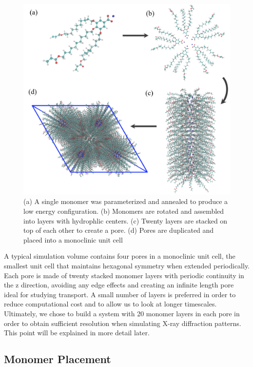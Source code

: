\documentclass{article}
\begin{document}
  \begin{figure}
	\centering
	\includegraphics[width=0.75\linewidth]{build.PNG} %
	\caption{(a) A single monomer was parameterized and annealed to produce a low energy
		configuration. (b) Monomers are rotated and assembled into layers with 
		hydrophlic centers. (c) Twenty layers are stacked on top of each other to create
		a pore. (d) Pores are duplicated and placed into a monoclinic unit cell}\label{fig:python}
  \end{figure}
  
  A typical simulation volume contains four pores in a monoclinic unit cell,
  the smallest unit cell that maintains hexagonal symmetry when extended
  periodically. Each pore is made of twenty stacked monomer layers with periodic
  continuity in the z direction, avoiding any edge effects and creating an
  infinite length pore ideal for studying transport. A small number of layers is
  preferred in order to reduce computational cost and to allow us to look at
  longer timescales. Ultimately, we chose to build a system with 20 monomer
  layers in each pore in order to obtain sufficient resolution when simulating
  X-ray diffraction patterns. This point will be explained in more detail later.

\subsection*{Monomer Placement} 
\end{document}
